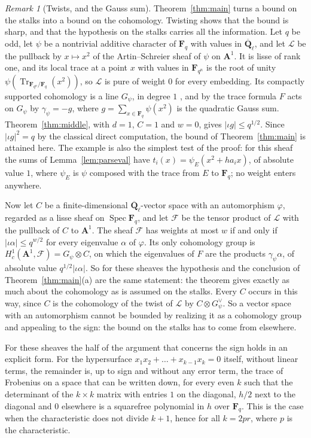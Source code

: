\documentclass[11pt,a4paper]{article}
\theoremstyle{plain}
\theoremstyle{remark}
\newtheorem{remark}[theorem]{Remark}
\newcommand{\Fq}{\mathbf F_q}
\newcommand{\Ql}{\overline{\mathbf Q}_\ell}
\newcommand{\A}{\mathbf A}
\newcommand{\F}{\mathcal F}
\newcommand{\Tr}{\operatorname{Tr}}
\begin{document}
\begin{remark}[Twists, and the Gauss sum]\label{rem:twist}
Theorem~\ref{thm:main} turns a bound on the stalks into a bound on the cohomology. Twisting shows that the bound is
sharp, and that the hypothesis on the stalks carries all the information. Let $q$ be odd, let $\psi$ be a nontrivial
additive character of $\Fq$ with values in $\Ql$, and let $\mathcal L$ be the pullback by $x\mapsto x^2$ of the
Artin--Schreier sheaf of $\psi$ on $\A^1$. It is lisse of rank one, and its local trace at a point $x$ with values
in $\mathbf F_{q^n}$ is the root of unity $\psi(\Tr_{\mathbf F_{q^n}/\Fq}(x^2))$, so $\mathcal L$ is pure of weight
$0$ for every embedding. Its compactly supported cohomology is a line $G_\psi$, in degree $1$
\cite[Sommes trig., \S4]{SGA4h}, and by the trace formula $F$ acts on $G_\psi$ by $\gamma_\psi=-g$, where
$g=\sum_{x\in\Fq}\psi(x^2)$ is the quadratic Gauss sum. Theorem~\ref{thm:middle}, with $d=1$, $C=1$ and $w=0$, gives
$|\iota g|\le q^{1/2}$. Since $|\iota g|^2=q$ by the classical direct computation, the bound of
Theorem~\ref{thm:main} is attained here. The example is also the simplest test of the proof: for this sheaf the sums
of Lemma~\ref{lem:parseval} have $t_i(x)=\psi_E(x^2+ha_ix)$, of absolute value $1$, where $\psi_E$ is $\psi$
composed with the trace from $E$ to $\Fq$; no weight enters anywhere.

Now let $C$ be a finite-dimensional $\Ql$-vector space with an automorphism $\varphi$, regarded as a lisse sheaf on
$\operatorname{Spec}\Fq$, and let $\F$ be the tensor product of $\mathcal L$ with the pullback of $C$ to $\A^1$.
The sheaf $\F$ has weights at most $w$ if and only if $|\iota\alpha|\le q^{w/2}$ for every eigenvalue $\alpha$ of
$\varphi$. Its only cohomology group is $H^1_c(\A^1,\F)=G_\psi\otimes C$, on which the eigenvalues of $F$ are the
products $\gamma_\psi\alpha$, of absolute value $q^{1/2}|\iota\alpha|$. So for these sheaves the hypothesis and the
conclusion of Theorem~\ref{thm:main}(a) are the same statement: the theorem gives exactly as much about the
cohomology as is assumed on the stalks. Every $C$ occurs in this way, since $C$ is the cohomology of the twist of
$\mathcal L$ by $C\otimes G_\psi^\vee$. So a vector space with an automorphism cannot be bounded by realizing it as
a cohomology group and appealing to the sign: the bound on the stalks has to come from elsewhere.

For these sheaves the half of the argument that concerns the sign holds in an explicit form. For the hypersurface
$x_1x_2+\dots+x_{k-1}x_k=0$ itself, without linear terms, the remainder is, up to sign and without any error
term, the trace of Frobenius on a space that can be written down, for every even $k$ such that the determinant
of the $k\times k$ matrix with entries $1$ on the diagonal, $h/2$ next to the diagonal and $0$ elsewhere is a
squarefree polynomial in $h$ over $\Fq$. This is the case when the characteristic does not divide $k+1$, hence for
all $k=2pr$, where $p$ is the characteristic.
\end{remark}
\end{document}
